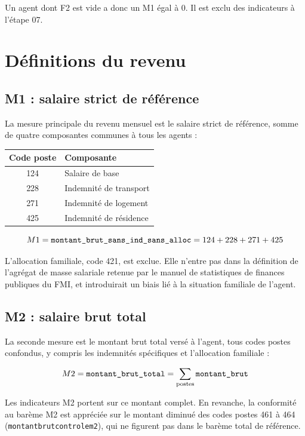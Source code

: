 \documentclass[12pt,a4paper,french]{article}
\renewcommand{\_}{\underscoreorigine\allowbreak}
\begin{document}
Un agent dont F2 est vide a donc un M1 égal à 0. Il est exclu des indicateurs à l'étape 07.

\section{Définitions du revenu}

\subsection{M1 : salaire strict de référence}

La mesure principale du revenu mensuel est le salaire strict de référence, somme de quatre composantes communes à tous les agents :

\begin{center}
\begin{tabular}{cl}
    \toprule
    \textbf{Code poste} & \textbf{Composante} \\
    \midrule
    124 & Salaire de base \\
    228 & Indemnité de transport \\
    271 & Indemnité de logement \\
    425 & Indemnité de résidence \\
    \bottomrule
\end{tabular}
\end{center}

\[
M1 = \texttt{montant\_brut\_sans\_ind\_sans\_alloc} = 124 + 228 + 271 + 425
\]

L'allocation familiale, code 421, est exclue. Elle n'entre pas dans la définition de l'agrégat de masse salariale retenue par le manuel de statistiques de finances publiques du FMI, et introduirait un biais lié à la situation familiale de l'agent.

\subsection{M2 : salaire brut total}

La seconde mesure est le montant brut total versé à l'agent, tous codes postes confondus, y compris les indemnités spécifiques et l'allocation familiale :

\[
M2 = \texttt{montant\_brut\_total} = \sum_{\text{postes}} \texttt{montant\_brut}
\]

Les indicateurs M2 portent sur ce montant complet. En revanche, la conformité au barème M2 est appréciée sur le montant diminué des codes postes 461 à 464 (\texttt{montant\_brut\_controle\_m2}), qui ne figurent pas dans le barème total de référence.
\end{document}
